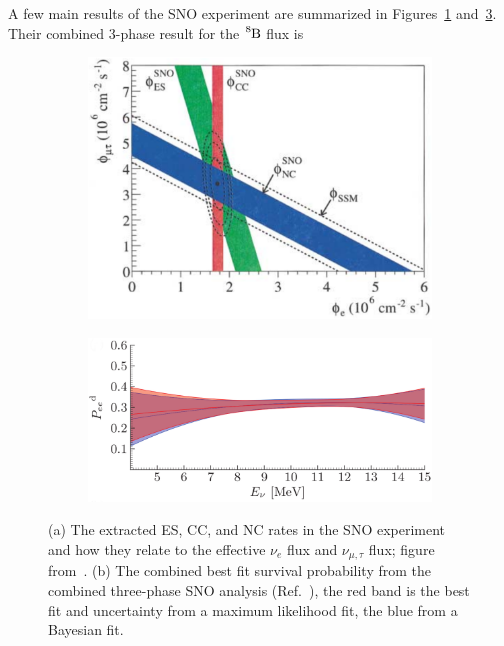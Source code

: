 A few main results of the SNO experiment are summarized in
Figures~\ref{fig:sno_cross_graph} and~\ref{fig:sno_pee1}.
Their combined 3-phase result for the $\ce{^{8}B}$ flux is
\begin{figure}
\centering
\begin{subfigure}[b]{0.48\textwidth}
\centering
\includegraphics[width=\textwidth]{sno_cross_graph}
\caption[]{}
\label{fig:sno_cross_graph}
\end{subfigure}
\hfill
\begin{subfigure}[b]{0.48\textwidth}
\centering
\includegraphics[width=\textwidth]{sno_pee}
\caption[]{}
\label{fig:sno_pee1}

\end{subfigure}
\caption[SNO Results]{(a) The extracted ES, CC, and NC rates in the
SNO experiment and how they relate to the
effective $\nu_{e}$ flux and $\nu_{\mu,\tau}$ flux; figure from~\citep{sno_second}.
 (b) The combined best fit survival probability from the combined three-phase SNO
analysis (Ref.~\citep{sno_combined}), the red band is the best fit and uncertainty
from a maximum likelihood fit, the blue from a Bayesian fit.}
\end{figure}

